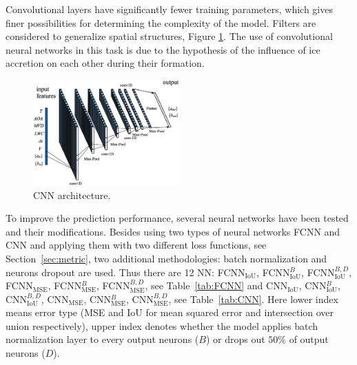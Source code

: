 \documentclass[aerospace,article,submit,moreauthors,pdftex]{Definitions/mdpi}
\begin{document}
Convolutional layers have significantly fewer training parameters, which gives finer possibilities for determining the complexity of the model. Filters are considered to generalize spatial structures, Figure \ref{fig:cnn}. The use of convolutional neural networks in this task is due to the hypothesis of the influence of ice accretion on each other during their formation.

\begin{figure}[H]
\centering
\includegraphics[width=0.5\textwidth]{Figures/CNNScheme.eps}
\caption{CNN architecture.\label{fig:cnn}}
\end{figure}  

To improve the prediction performance, several neural networks have been tested and their modifications. Besides using two types of neural networks FCNN and CNN and applying them with two different loss functions, see Section~\ref{sec:metric}, two additional methodologies: batch normalization and neurons dropout are used. Thus there are 12 NN:  FCNN$_{\text{IoU}}$, FCNN$_{\text{IoU}}^{B}$, FCNN$_{\text{IoU}}^{B,D}$, FCNN$_{\text{MSE}}$, FCNN$_{\text{MSE}}^{B}$, FCNN$_{\text{MSE}}^{B,D}$, see Table~\ref{tab:FCNN} and CNN$_{\text{IoU}}$, CNN$_{\text{IoU}}^{B}$, CNN$_{\text{IoU}}^{B,D}$, CNN$_{\text{MSE}}$, CNN$_{\text{MSE}}^{B}$, CNN$_{\text{MSE}}^{B,D}$, see Table~\ref{tab:CNN}. Here lower index means error type (MSE and IoU for mean squared error and intersection over union respectively), upper index denotes whether the model applies batch normalization layer to every output neurons ($B$) or drops out $50\%$ of output neurons ($D$).
\end{document}

